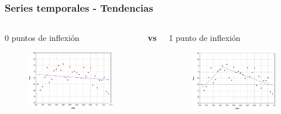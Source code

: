 \documentclass{beamer}
\begin{document}
\begin{frame}\frametitle{Series temporales - Tendencias}
	\begin{columns}
		\begin{column}{0.5\textwidth}
			\centering \normalsize 0 puntos de inflexión
			\begin{figure}
				\includegraphics[width=\textwidth]{images/jpo0.png}
			\end{figure}
			
		\end{column}
		\large{\textbf{vs}}
		\begin{column}{0.5\textwidth}
			\centering \normalsize 1 punto de inflexión
			\begin{figure}
				\centering
				\includegraphics[width=\textwidth]{images/jpo1.png}
			\end{figure}
		\end{column}
	\end{columns}
\end{frame}
\end{document}
